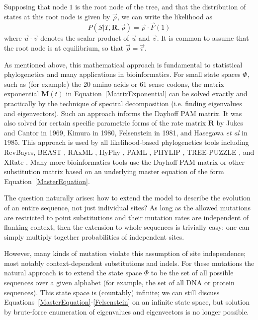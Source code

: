 \documentclass{bmcart}
\newcommand{\matr}[1]{\mathbf{#1}}
\newcommand{\eqref}[1]{Equation~\ref{#1}}
\newcommand{\statespace}{\Phi}
\newcommand{\ratematrix}{\matr{R}}
\newcommand{\eqmvec}{\vec{\pi}}
\newcommand{\condmatrix}{\matr{M}}
\newcommand{\felsvec}{\vec{F}}
\newcommand{\scalarprod}{\cdot}
\newcommand{\initvec}{\vec{\rho}}
\begin{document}
Supposing that node $1$ is the root node of the tree,
and that the distribution of states at this root node is given by $\initvec$,
we can write the likelihood as
\begin{equation}
P(S|T,\ratematrix,\initvec) = \initvec \scalarprod \felsvec(1)
\label{Likelihood}
\end{equation}
where $\vec{u} \scalarprod \vec{v}$ denotes the scalar product of $\vec{u}$ and $\vec{v}$.
It is common to assume that the root node is at equilibrium,
so that $\initvec = \eqmvec$.

As mentioned above, this mathematical approach is fundamental to statistical phylogenetics
and many applications in bioinformatics.
For small state spaces $\statespace$, such as (for example) the 20 amino acids or 61 sense codons,
the matrix exponential $\condmatrix(t)$ in \eqref{MatrixExponential} can be solved exactly and practically
by the technique of spectral decomposition (i.e. finding eigenvalues and eigenvectors).
Such an approach informs the Dayhoff PAM matrix.
It was also solved for certain specific parametric forms of the rate matrix $\ratematrix$
by Jukes and Cantor in 1969, Kimura in 1980, Felsenstein in 1981, and Hasegawa {\em et al} in 1985.
This approach is used by all likelihood-based phylogenetics tools including
RevBayes\cite{HohnaEtAl2016},
BEAST \cite{pmid17996036},
RAxML \cite{pmid16928733},
HyPhy \cite{pmid15509596},
PAML \cite{pmid17483113},
PHYLIP \cite{Felsenstein1989},
TREE-PUZZLE \cite{pmid11934758},
and XRate \cite{pmid22693624}.
Many more bioinformatics tools use the Dayhoff PAM matrix or other substitution matrix
based on an underlying master equation of the form \eqref{MasterEquation}.

The question naturally arises: how to extend the model to describe the evolution of an entire sequence,
not just individual sites?
As long as the allowed mutations are restricted to point substitutions
and their mutation rates are independent of flanking context,
then the extension to whole sequences is trivially easy:
one can simply multiply together probabilities of independent sites.

However, many kinds of mutation violate this assumption of site independence;
most notably context-dependent substitutions and indels.
For these mutations the natural approach is to extend the state space $\statespace$
to be the set of all possible sequences over a given alphabet
(for example, the set of all DNA or protein sequences).
This state space is (countably) infinite;
we can still discuss Equations~\ref{MasterEquation}-\ref{Felsenstein}
on an infinite state space,
but solution by brute-force enumeration of eigenvalues and eigenvectors is no longer possible.
\end{document}
